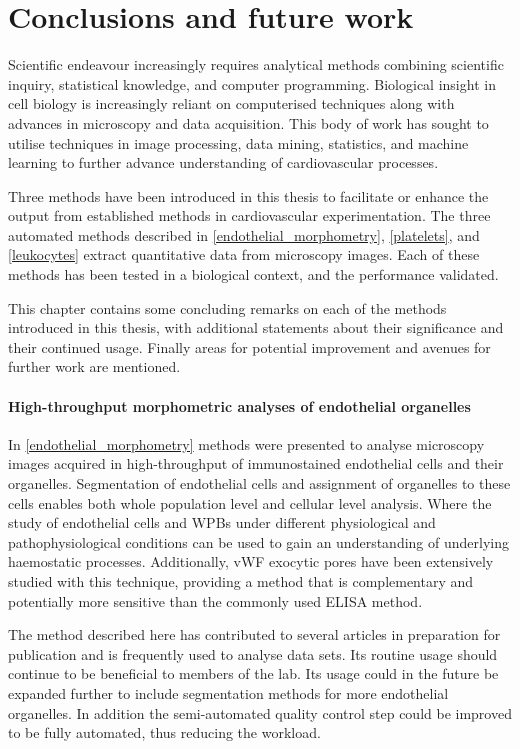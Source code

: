 \chapter{Conclusions and future work}
\label{conclusions_and_future}
\ifpdf
    \graphicspath{{chapter_5/figs/}}
\fi

Scientific endeavour increasingly requires analytical methods combining scientific inquiry, statistical knowledge, and computer programming. Biological insight in cell biology is increasingly reliant on computerised techniques along with advances in microscopy and data acquisition. This body of work has sought to utilise techniques in image processing, data mining, statistics, and machine learning to further advance understanding of cardiovascular processes.

Three methods have been introduced in this thesis to facilitate or enhance the output from established methods in cardiovascular experimentation. The three automated methods described in \autoref{endothelial_morphometry}, \autoref{platelets}, and \autoref{leukocytes} extract quantitative data from microscopy images. Each of these methods has been tested in a biological context, and the performance validated.

This chapter contains some concluding remarks on each of the methods introduced in this thesis, with additional statements about their significance and their continued usage. Finally areas for potential improvement and avenues for further work are mentioned.

\subsubsection{High-throughput morphometric analyses of endothelial organelles}
In \autoref{endothelial_morphometry} methods were presented to analyse microscopy images acquired in high-throughput of immunostained endothelial cells and their organelles. Segmentation of endothelial cells and assignment of organelles to these cells enables both whole population level and cellular level analysis. Where the study of endothelial cells and WPBs under different physiological and pathophysiological conditions can be used to gain an understanding of underlying haemostatic processes. Additionally, vWF exocytic pores have been extensively studied with this technique, providing a method that is complementary and potentially more sensitive than the commonly used ELISA method.

The method described here has contributed to several articles in preparation for publication and is frequently used to analyse data sets. Its routine usage should continue to be beneficial to members of the lab. Its usage could in the future be expanded further to include segmentation methods for more endothelial organelles. In addition the semi-automated quality control step could be improved to be fully automated, thus reducing the workload.

